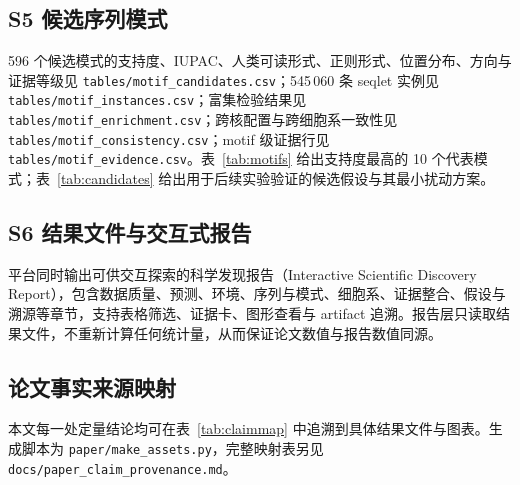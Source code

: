 \subsection*{S5 候选序列模式}
596 个候选模式的支持度、IUPAC、人类可读形式、正则形式、位置分布、方向与证据等级见 \texttt{tables/motif\_candidates.csv}；545\,060 条 seqlet 实例见 \texttt{tables/motif\_instances.csv}；富集检验结果见 \texttt{tables/motif\_enrichment.csv}；跨核配置与跨细胞系一致性见 \texttt{tables/motif\_consistency.csv}；motif 级证据行见 \texttt{tables/motif\_evidence.csv}。表~\ref{tab:motifs} 给出支持度最高的 10 个代表模式；表~\ref{tab:candidates} 给出用于后续实验验证的候选假设与其最小扰动方案。

\subsection*{S6 结果文件与交互式报告}
平台同时输出可供交互探索的科学发现报告（Interactive Scientific Discovery Report），包含数据质量、预测、环境、序列与模式、细胞系、证据整合、假设与溯源等章节，支持表格筛选、证据卡、图形查看与 artifact 追溯。报告层只读取结果文件，不重新计算任何统计量，从而保证论文数值与报告数值同源。

\subsection{论文事实来源映射}
\label{app:provenance}
本文每一处定量结论均可在表~\ref{tab:claimmap} 中追溯到具体结果文件与图表。生成脚本为 \texttt{paper/make\_assets.py}，完整映射表另见 \texttt{docs/paper\_claim\_provenance.md}。

